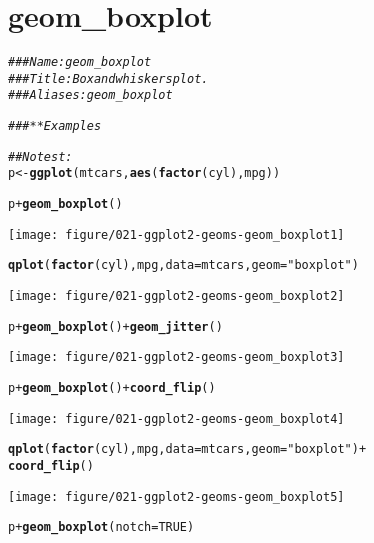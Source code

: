 \documentclass[a4paper,titlepage]{tufte-handout}\usepackage[]{graphicx}\usepackage[]{color}
\makeatletter
\def\maxwidth{ %
  \ifdim\Gin@nat@width>\linewidth
    \linewidth
  \else
    \Gin@nat@width
  \fi
}
\newcommand{\hlnum}[1]{\textcolor[rgb]{0.686,0.059,0.569}{#1}}%
\newcommand{\hlstr}[1]{\textcolor[rgb]{0.192,0.494,0.8}{#1}}%
\newcommand{\hlcom}[1]{\textcolor[rgb]{0.678,0.584,0.686}{\textit{#1}}}%
\newcommand{\hlopt}[1]{\textcolor[rgb]{0,0,0}{#1}}%
\newcommand{\hlstd}[1]{\textcolor[rgb]{0.345,0.345,0.345}{#1}}%
\newcommand{\hlkwb}[1]{\textcolor[rgb]{0.69,0.353,0.396}{#1}}%
\newcommand{\hlkwc}[1]{\textcolor[rgb]{0.333,0.667,0.333}{#1}}%
\newcommand{\hlkwd}[1]{\textcolor[rgb]{0.737,0.353,0.396}{\textbf{#1}}}%
\newenvironment{kframe}{%
 \def\at@end@of@kframe{}%
 \ifinner\ifhmode%
  \def\at@end@of@kframe{\end{minipage}}%
  \begin{minipage}{\columnwidth}%
 \fi\fi%
 \def\FrameCommand##1{\hskip\@totalleftmargin \hskip-\fboxsep
 \colorbox{shadecolor}{##1}\hskip-\fboxsep
     \hskip-\linewidth \hskip-\@totalleftmargin \hskip\columnwidth}%
 \MakeFramed {\advance\hsize-\width
   \@totalleftmargin\z@ \linewidth\hsize
   \@setminipage}}%
 {\par\unskip\endMakeFramed%
 \at@end@of@kframe}
\newenvironment{knitrout}{}{} %
\makeatother
\begin{document}
\section{geom\_boxplot}

\begin{knitrout}
\color{fgcolor}\begin{kframe}
\begin{alltt}
\hlcom{### Name: geom_boxplot}
\hlcom{### Title: Box and whiskers plot.}
\hlcom{### Aliases: geom_boxplot}

\hlcom{### ** Examples}

\hlcom{## No test: }
\hlstd{p} \hlkwb{<-} \hlkwd{ggplot}\hlstd{(mtcars,} \hlkwd{aes}\hlstd{(}\hlkwd{factor}\hlstd{(cyl), mpg))}

\hlstd{p} \hlopt{+} \hlkwd{geom_boxplot}\hlstd{()}
\end{alltt}
\end{kframe}
\texttt{[image: figure/021-ggplot2-geoms-geom\_boxplot1]} 
\begin{kframe}\begin{alltt}
\hlkwd{qplot}\hlstd{(}\hlkwd{factor}\hlstd{(cyl), mpg,} \hlkwc{data} \hlstd{= mtcars,} \hlkwc{geom} \hlstd{=} \hlstr{"boxplot"}\hlstd{)}
\end{alltt}
\end{kframe}
\texttt{[image: figure/021-ggplot2-geoms-geom\_boxplot2]} 
\begin{kframe}\begin{alltt}
\hlstd{p} \hlopt{+} \hlkwd{geom_boxplot}\hlstd{()} \hlopt{+} \hlkwd{geom_jitter}\hlstd{()}
\end{alltt}
\end{kframe}
\texttt{[image: figure/021-ggplot2-geoms-geom\_boxplot3]} 
\begin{kframe}\begin{alltt}
\hlstd{p} \hlopt{+} \hlkwd{geom_boxplot}\hlstd{()} \hlopt{+} \hlkwd{coord_flip}\hlstd{()}
\end{alltt}
\end{kframe}
\texttt{[image: figure/021-ggplot2-geoms-geom\_boxplot4]} 
\begin{kframe}\begin{alltt}
\hlkwd{qplot}\hlstd{(}\hlkwd{factor}\hlstd{(cyl), mpg,} \hlkwc{data} \hlstd{= mtcars,} \hlkwc{geom} \hlstd{=} \hlstr{"boxplot"}\hlstd{)} \hlopt{+}
  \hlkwd{coord_flip}\hlstd{()}
\end{alltt}
\end{kframe}
\texttt{[image: figure/021-ggplot2-geoms-geom\_boxplot5]} 
\begin{kframe}\begin{alltt}
\hlstd{p} \hlopt{+} \hlkwd{geom_boxplot}\hlstd{(}\hlkwc{notch} \hlstd{=} \hlnum{TRUE}\hlstd{)}
\end{alltt}



\end{kframe}
\end{knitrout}
\end{document}
